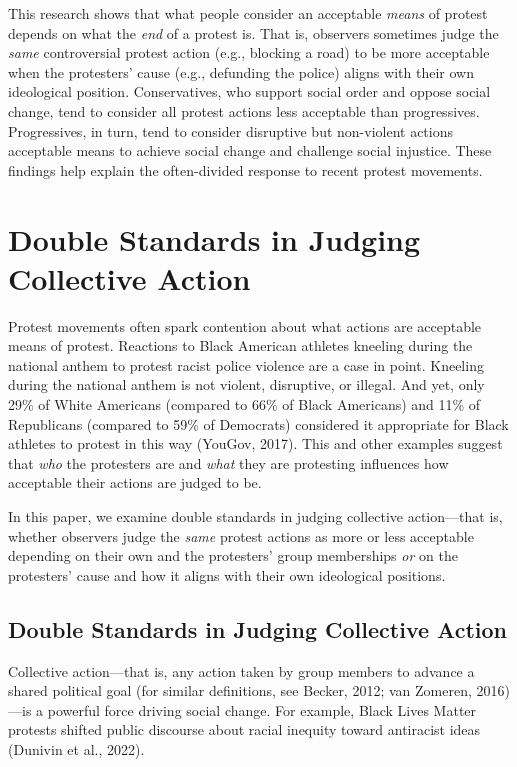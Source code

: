 \documentclass[12pt, letterpaper]{article}
\begin{document}
\noindent This research shows that what people consider an acceptable
\emph{means} of protest depends on what the \emph{end} of a protest is.
That is, observers sometimes judge the \emph{same} controversial protest
action (e.g., blocking a road) to be more acceptable when the
protesters' cause (e.g., defunding the police) aligns with their own
ideological position. Conservatives, who support social order and oppose
social change, tend to consider all protest actions less acceptable than
progressives. Progressives, in turn, tend to consider disruptive but
non-violent actions acceptable means to achieve social change and
challenge social injustice. These findings help explain the
often-divided response to recent protest movements.

\newpage

\section{ Double Standards in Judging Collective Action }

Protest movements often spark contention about what actions are
acceptable means of protest. Reactions to Black American athletes
kneeling during the national anthem to protest racist police violence
are a case in point. Kneeling during the national anthem is not violent,
disruptive, or illegal. And yet, only 29\% of White Americans (compared
to 66\% of Black Americans) and 11\% of Republicans (compared to 59\% of
Democrats) considered it appropriate for Black athletes to protest in
this way (YouGov, 2017). This and other examples suggest that \emph{who}
the protesters are and \emph{what} they are protesting influences how
acceptable their actions are judged to be.

In this paper, we examine double standards in judging collective
action---that is, whether observers judge the \emph{same} protest
actions as more or less acceptable depending on their own and the
protesters' group memberships \emph{or} on the protesters' cause and how
it aligns with their own ideological positions.

\hypertarget{double-standards-in-judging-collective-action}{%
\subsection{Double Standards in Judging Collective
Action}\label{double-standards-in-judging-collective-action}}

Collective action---that is, any action taken by group members to
advance a shared political goal (for similar definitions, see Becker,
2012; van Zomeren, 2016)---is a powerful force driving social change.
For example, Black Lives Matter protests shifted public discourse about
racial inequity toward antiracist ideas (Dunivin et al., 2022).
\end{document}
